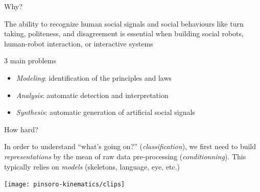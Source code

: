 \documentclass[compress]{beamer}
\begin{document}
\begin{frame}{Why?}

    The ability to recognize human social signals and social behaviours like turn
    taking, politeness, and disagreement is essential when building social
    robots, human-robot interaction, or interactive systems

\pause

    \begin{exampleblock}{3 main problems}

    \begin{itemize}
        \item \emph{Modeling}: identification of the principles and laws
        \item \emph{Analysis}: automatic detection and interpretation
        \item \emph{Synthesis}: automatic generation of artificial social
            signals
    \end{itemize}

    \end{exampleblock}
\end{frame}

\begin{frame}{How hard?}

    In order to understand ``what's going on?'' (\emph{classification}), we
    first need to build \emph{representations} by the mean of raw data
    pre-processing (\emph{conditionning}). This typically relies on
    \emph{models} (skeletons, language, eye, etc.)

    \begin{center}
        \texttt{[image: pinsoro-kinematics/clips]}
    \end{center}

\end{frame}




\end{document}
